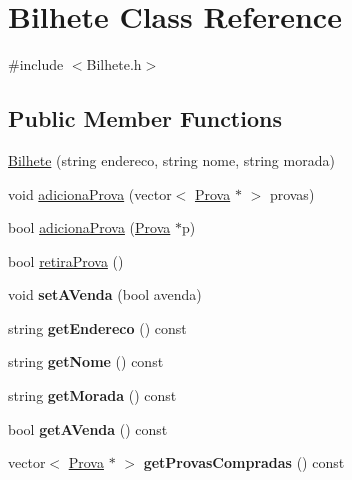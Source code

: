 \hypertarget{class_bilhete}{}\section{Bilhete Class Reference}
\label{class_bilhete}


{\ttfamily \#include $<$Bilhete.\+h$>$}

\subsection*{Public Member Functions}
\begin{DoxyCompactItemize}
\item 
\hyperlink{class_bilhete_a70953a5ccec95a6e5fd94c960718f517}{Bilhete} (string endereco, string nome, string morada)
\item 
void \hyperlink{class_bilhete_afc80fa8bd65add44982f6ea8756c5881}{adiciona\+Prova} (vector$<$ \hyperlink{class_prova}{Prova} $\ast$ $>$ provas)
\item 
bool \hyperlink{class_bilhete_a6e988a05e9b3875dd386ee1fcb10330c}{adiciona\+Prova} (\hyperlink{class_prova}{Prova} $\ast$p)
\item 
bool \hyperlink{class_bilhete_a7ac3fe666c70b096f8751e38d1f0dd89}{retira\+Prova} ()
\item 
\hypertarget{class_bilhete_a229d943f8b1fd805726b7df9f8daffc3}{}void {\bfseries set\+A\+Venda} (bool avenda)\label{class_bilhete_a229d943f8b1fd805726b7df9f8daffc3}

\item 
\hypertarget{class_bilhete_af923a95602b16b463e0646616c15e27c}{}string {\bfseries get\+Endereco} () const \label{class_bilhete_af923a95602b16b463e0646616c15e27c}

\item 
\hypertarget{class_bilhete_a71ec233ab283a82ba19ddc653bfeeb80}{}string {\bfseries get\+Nome} () const \label{class_bilhete_a71ec233ab283a82ba19ddc653bfeeb80}

\item 
\hypertarget{class_bilhete_a3406791595a7620538fdfbc5f17d5c1b}{}string {\bfseries get\+Morada} () const \label{class_bilhete_a3406791595a7620538fdfbc5f17d5c1b}

\item 
\hypertarget{class_bilhete_a8c3fd91a7d7c1d715331a2c1bfe36f5b}{}bool {\bfseries get\+A\+Venda} () const \label{class_bilhete_a8c3fd91a7d7c1d715331a2c1bfe36f5b}

\item 
\hypertarget{class_bilhete_a31a73368dd3c50b67190921cb533b5d3}{}vector$<$ \hyperlink{class_prova}{Prova} $\ast$ $>$ {\bfseries get\+Provas\+Compradas} () const \label{class_bilhete_a31a73368dd3c50b67190921cb533b5d3}

\end{DoxyCompactItemize}
